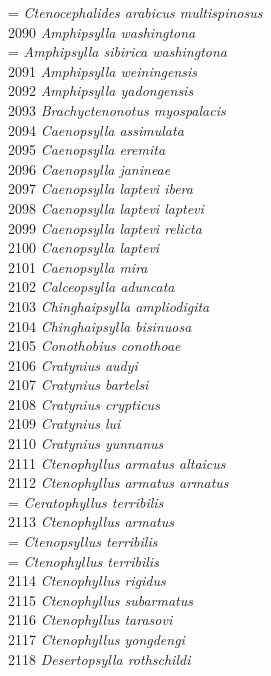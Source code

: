 \documentclass[
]{article}
\begin{document}
= \emph{Ctenocephalides arabicus multispinosus}\\
2090 \emph{Amphipsylla washingtona}\\
= \emph{Amphipsylla sibirica washingtona}\\
2091 \emph{Amphipsylla weiningensis}\\
2092 \emph{Amphipsylla yadongensis}\\
2093 \emph{Brachyctenonotus myospalacis}\\
2094 \emph{Caenopsylla assimulata}\\
2095 \emph{Caenopsylla eremita}\\
2096 \emph{Caenopsylla janineae}\\
2097 \emph{Caenopsylla laptevi ibera}\\
2098 \emph{Caenopsylla laptevi laptevi}\\
2099 \emph{Caenopsylla laptevi relicta}\\
2100 \emph{Caenopsylla laptevi}\\
2101 \emph{Caenopsylla mira}\\
2102 \emph{Calceopsylla aduncata}\\
2103 \emph{Chinghaipsylla ampliodigita}\\
2104 \emph{Chinghaipsylla bisinuosa}\\
2105 \emph{Conothobius conothoae}\\
2106 \emph{Cratynius audyi}\\
2107 \emph{Cratynius bartelsi}\\
2108 \emph{Cratynius crypticus}\\
2109 \emph{Cratynius lui}\\
2110 \emph{Cratynius yunnanus}\\
2111 \emph{Ctenophyllus armatus altaicus}\\
2112 \emph{Ctenophyllus armatus armatus}\\
= \emph{Ceratophyllus terribilis}\\
2113 \emph{Ctenophyllus armatus}\\
= \emph{Ctenopsyllus terribilis}\\
= \emph{Ctenophyllus terribilis}\\
2114 \emph{Ctenophyllus rigidus}\\
2115 \emph{Ctenophyllus subarmatus}\\
2116 \emph{Ctenophyllus tarasovi}\\
2117 \emph{Ctenophyllus yongdengi}\\
2118 \emph{Desertopsylla rothschildi}\\
\end{document}
